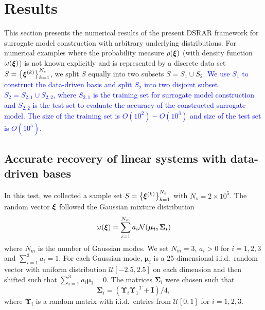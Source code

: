 \section{Results} \label{sec:numerical}

This section presents the numerical results of the present \ac{DSRAR} framework for surrogate model construction with 
arbitrary underlying distributions. For numerical examples where the probability measure $\rho(\bm\xi)$ (with density function 
$\omega(\bm\xi)$) is not known explicitly and is represented by a discrete data 
set $S= \left\{\bm\xi^{(k)}\right\}_{k = 1}^{N_s}$, we split $S$ equally into two subsets $S=S_1\cup S_2$.
\textcolor{blue}{We use $S_1$ to construct the data-driven  basis and split $S_2$ into two disjoint subset 
$S_2 = S_{2,1}\cup S_{2,2}$, where $S_{2,1}$ is the training set for surrogate model construction and $S_{2,2}$ is the test
set to evaluate the accuracy of the constructed surrogate model. The size of the training set is $O(10^2) - O(10^3)$ 
and size of the test set is $O(10^5)$.} 


\subsection{Accurate recovery of linear systems with data-driven bases} \label{sec:basis_comparison}

In this test, we collected a sample set $S = \left\{\bm\xi^{(k)}\right\}_{k = 1}^{N_s}$ with $N_s = 2\times10^5$.
The random vector $\bm\xi$ followed the Gaussian mixture distribution 
\begin{equation}
  \omega (\bm\xi) = \sum_{i=1}^{N_m} a_i \mathcal{N}(\bm{\mu_i,\Sigma_i})
  \label{eq:GM_test_set}
\end{equation}
where $N_m$ is the number of Gaussian modes.
We set $N_m = 3$, $a_i>0$ for $i=1,2,3$ and $\sum_{i=1}^3 a_i = 1$.
For each Gaussian mode, $\bm\mu_i$ is a 25-dimensional i.i.d.\ random vector with uniform distribution $\mathcal{U}[-2.5,2.5]$ on each dimension and then shifted such that $\sum_{i=1}^3 a_i \bm\mu_i = 0$.
The matrices $\bm \Sigma_i$ were chosen such that 
\begin{equation}
  \bm\Sigma_i = (\bm \Upsilon_i {\bm \Upsilon_1}^T + \mathbf{I})/4,
  \label{eq:GM_var}
\end{equation}
where $\bm\Upsilon_i$ is a random matrix with i.i.d.\ entries from $\mathcal{U}[0,1]$ for $i=1,2,3$.


